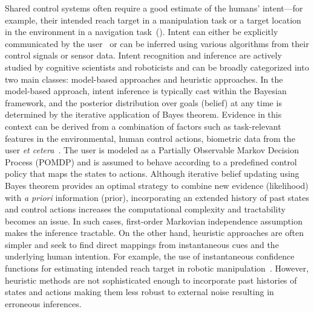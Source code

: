Shared control systems often require a good estimate of the humans' intent---for example, their intended reach target in a manipulation task or a target location in the environment in a navigation task~(\cite{liu2016goal}). Intent can either be explicitly communicated by the user~\cite{choi2008laser} or can be inferred using various algorithms from their control signals or sensor data. Intent recognition and inference are actively studied by cognitive scientists and roboticists and can be broadly categorized into two main classes: model-based approaches and heuristic approaches. In the model-based approach, intent inference is typically cast within the Bayesian framework, and the posterior distribution over goals (belief) at any time is determined by the iterative application of Bayes theorem. Evidence in this context can be derived from a combination of factors such as task-relevant features in the environmental, human control actions, biometric data from the user \textit{et cetera}~\cite{baker2007goal, baker2009action}. The user is modeled as a Partially Observable Markov Decision Process (POMDP) and is assumed to behave according to a predefined control policy that maps the states to actions. Although iterative belief updating using Bayes theorem provides an optimal strategy to combine new evidence (likelihood) with \textit{a priori} information (prior), incorporating an extended history of past states and control actions increases the computational complexity and tractability becomes an issue. In such cases,  first-order Markovian independence assumption makes the inference tractable. On the other hand, heuristic approaches are often simpler and seek to find direct mappings from instantaneous cues and the underlying human intention. For example, the use of instantaneous confidence functions for estimating intended reach target in robotic manipulation~\cite{dragan2012assistive, gopinath2017human}.  However, heuristic methods are not sophisticated enough to incorporate past histories of states and actions making them less robust to external noise resulting in erroneous inferences. 

